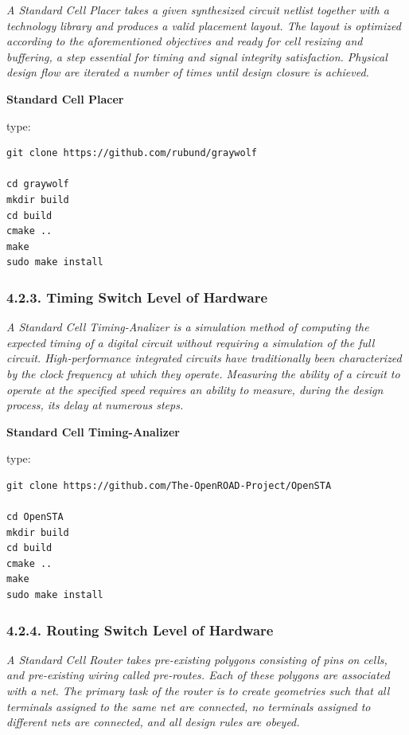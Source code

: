 \documentclass[
]{article}
\begin{document}
\emph{A Standard Cell Placer takes a given synthesized circuit netlist
together with a technology library and produces a valid placement
layout. The layout is optimized according to the aforementioned
objectives and ready for cell resizing and buffering, a step essential
for timing and signal integrity satisfaction. Physical design flow are
iterated a number of times until design closure is achieved.}

\textbf{Standard Cell Placer}

type:

\begin{verbatim}
git clone https://github.com/rubund/graywolf

cd graywolf
mkdir build
cd build
cmake ..
make
sudo make install
\end{verbatim}

\hypertarget{timing-switch-level-of-hardware}{%
\subsubsection{4.2.3. Timing Switch Level of
Hardware}\label{timing-switch-level-of-hardware}}

\emph{A Standard Cell Timing-Analizer is a simulation method of
computing the expected timing of a digital circuit without requiring a
simulation of the full circuit. High-performance integrated circuits
have traditionally been characterized by the clock frequency at which
they operate. Measuring the ability of a circuit to operate at the
specified speed requires an ability to measure, during the design
process, its delay at numerous steps.}

\textbf{Standard Cell Timing-Analizer}

type:

\begin{verbatim}
git clone https://github.com/The-OpenROAD-Project/OpenSTA

cd OpenSTA
mkdir build
cd build
cmake ..
make
sudo make install
\end{verbatim}

\hypertarget{routing-switch-level-of-hardware}{%
\subsubsection{4.2.4. Routing Switch Level of
Hardware}\label{routing-switch-level-of-hardware}}

\emph{A Standard Cell Router takes pre-existing polygons consisting of
pins on cells, and pre-existing wiring called pre-routes. Each of these
polygons are associated with a net. The primary task of the router is to
create geometries such that all terminals assigned to the same net are
connected, no terminals assigned to different nets are connected, and
all design rules are obeyed.}
\end{document}
